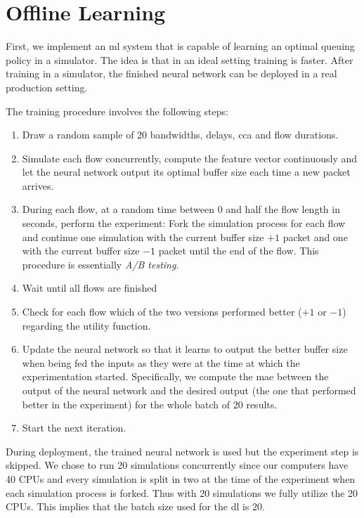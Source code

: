 \documentclass[conference]{IEEEtran}
\begin{document}
\section{Offline Learning}

First, we implement an \gls{ml} system that is capable of learning an optimal queuing policy in a simulator. The idea is that in an ideal setting training is faster. After training in a simulator, the finished neural network can be deployed in a real production setting. 

The training procedure involves the following steps:
\begin{enumerate}
\item Draw a random sample of 20 bandwidths, delays, \gls{cca} and flow durations.
\item Simulate each flow concurrently, compute the feature vector continuously and let the neural network output its optimal buffer size each time a new packet arrives. 
\item During each flow, at a random time between 0 and half the flow length in seconds, perform the experiment: Fork the simulation process for each flow and continue one simulation with the current buffer size $+1$ packet and one with the current buffer size $-1$ packet until the end of the flow. This procedure is essentially \textit{A/B testing}.  
\item Wait until all flows are finished
\item Check for each flow which of the two versions performed better ($+1$ or $-1$) regarding the utility function.
\item Update the neural network so that it learns to output the better buffer size when being fed the inputs as they were at the time at which the experimentation started. Specifically, we compute the \gls{mae} between the output of the neural network and the desired output (the one that performed better in the experiment) for the whole batch of 20 results.
\item Start the next iteration. 
\end{enumerate}

During deployment, the trained neural network is used but the experiment step is skipped. We chose to run 20 simulations concurrently since our computers have 40 CPUs and every simulation is split in two at the time of the experiment when each simulation process is forked. Thus with 20 simulations we fully utilize the 20 CPUs. This implies that the batch size used for the \gls{dl} is 20. 
\end{document}
